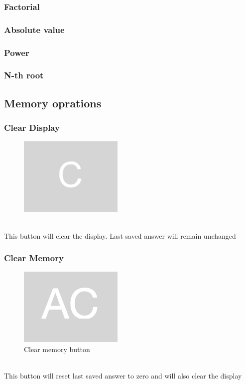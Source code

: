 \documentclass[11pt, a4paper]{article}
\begin{document}
    \subsubsection{Factorial}

    \subsubsection{Absolute value}

    \subsubsection{Power}

    \subsubsection{N-th root}

    \newpage

    \subsection{Memory oprations}

    \subsubsection{Clear Display }

    \begin{figure}[h]
        \includegraphics[scale = 0.2]{clear_display}
        \centering
        \label{fig:ac}
    \end{figure}
    \\
    This button will clear the display. Last saved answer will remain unchanged

    \subsubsection{Clear Memory}

    \begin{figure}[h]
        \includegraphics[scale = 0.2]{clear_memory}
        \caption{Clear memory button}
        \centering
        \label{fig:c}
    \end{figure}
    \\
    This button will reset last saved answer to zero and will also clear the display
\end{document}

